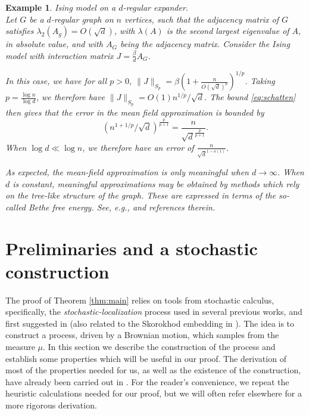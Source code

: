 \documentclass[12pt]{article}
\newtheorem{example}{Example}
\theoremstyle{definition}
\theoremstyle{remark}
\begin{document}
\begin{example}\emph{Ising model on a $d$-regular expander.}\\
Let $G$ be a $d$-regular graph on $n$ vertices, such that the adjacency matrix of $G$ satisfies $\lambda_2(A_g) = O(\sqrt{d})$, with $\lambda(A)$ is the second largest eigenvalue of $A$, in absolute value, and with $A_G$ being the adjacency matrix. Consider the Ising model with interaction matrix $J = \frac{\beta}{d} A_G$.

In this case, we have for all $p>0$, $\|J\|_{S_p} = \beta \left (1 + \frac{n}{O(\sqrt{d})^p} \right )^{1/p}$. Taking $p = \frac{\log n}{\log d}$, we therefore have $\|J\|_{S_p} = O(1) n^{1/p}/\sqrt{d}$. The bound \eqref{eq:schatten} then gives that the error in the mean field approximation is bounded by
$$
\left ( n^{1+1/p} / \sqrt{d} \right )^{\frac{p}{p+1}} = \frac{n}{\sqrt{d}^{\frac{p}{p+1}}}.
$$
When $\log d \ll \log n$, we therefore have an error of $\frac{n}{\sqrt{d}^{1-o(1)} }$.

As expected, the mean-field approximation is only meaningful when $d \to \infty$. When $d$ is constant, meaningful approximations may be obtained by methods which rely on the tree-like structure of the graph. These are expressed in terms of the so-called Bethe free energy. See, e.g., \cite{DMS13, CP17} and references therein.
\end{example}

\section{Preliminaries and a stochastic construction} \label{sec:constr}

The proof of Theorem \ref{thm:main} relies on tools from stochastic calculus, specifically, the \emph{stochastic-localization} process used in several previous works, and first suggested in \cite{Eldan-thin-KLS} (also related to the Skorokhod embedding in \cite{eldan2016skorokhod}). The idea is to construct a process, driven by a Brownian motion, which samples from the measure $\mu$. In this section we describe the construction of the process and establish some properties which will be useful in our proof. The derivation of most of the properties needed for us, as well as the existence of the construction, have already been carried out in \cite{EMZ-CLT}. For the reader's convenience, we repeat the heuristic calculations needed for our proof, but we will often refer elsewhere for a more rigorous derivation. \\
\end{document}
